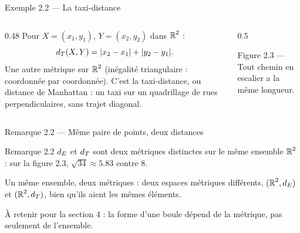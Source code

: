 \begin{frame}{Exemple 2.2 --- La taxi-distance}
  \begin{columns}[c]
    \begin{column}{0.48\textwidth}
      \small Pour $X=(x_1,y_1)$, $Y=(x_2,y_2)$ dans $\operatorname{\mathbb{R}}^2$ :
      \[
        d_T(X,Y) = |x_2-x_1| + |y_2-y_1|.
      \]
      Une autre métrique sur $\operatorname{\mathbb{R}}^2$ (inégalité triangulaire : coordonnée
      par coordonnée). C'est la taxi-distance, ou distance
      de Manhattan : un taxi sur un quadrillage de rues
      perpendiculaires, sans trajet diagonal.
    \end{column}
    \begin{column}{0.5\textwidth}
      \begin{center}\scriptsize Figure 2.3 --- Tout chemin en escalier a
      la même longueur.\end{center}
    \end{column}
  \end{columns}
\end{frame}

\begin{frame}{Remarque 2.2 --- Même paire de points, deux distances}
  \begin{Rem}{Remarque 2.2}
    $d_E$ et $d_T$ sont deux métriques distinctes sur le
    même ensemble $\operatorname{\mathbb{R}}^2$ : sur la figure 2.3,
    $\sqrt{34}\approx\num{5.83}$ contre $8$.
    \vspace{4pt}

    Un même ensemble, deux métriques : deux espaces métriques
    différents, $(\operatorname{\mathbb{R}}^2,d_E)$ et $(\operatorname{\mathbb{R}}^2,d_T)$, bien qu'ils aient
    les mêmes éléments.
  \end{Rem}
  \vspace{6pt}
  \small À retenir pour la section 4 : la forme d'une boule
  dépend de la métrique, pas seulement de l'ensemble.
\end{frame}
